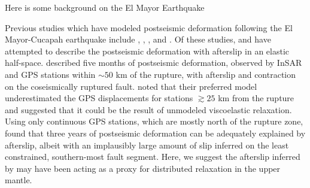 \documentclass[draft,linenumbers]{AGUJournal}
\begin{document}
Here is some background on the El Mayor Earthquake


Previous studies which have modeled postseismic deformation following the El Mayor-Cucapah earthquake include \citet{Pollitz2012}, \citet{Gonzalez-ortega2014}, \citet{Spinler2015}, and \citet{Rollins2015}. Of these studies, \citet{Gonzalez-ortega2014} and \citet{Rollins2015} have attempted to describe the postseismic deformation with afterslip in an elastic half-space.  \citet{Gonzalez-ortega2014} described five months of postseismic deformation, observed by InSAR and GPS stations within ${\sim}50$ km of the rupture, with afterslip and contraction on the coseismically ruptured fault. \citet{Gonzalez-ortega2014} noted that their preferred model underestimated the GPS displacements for stations $\gtrsim 25$ km from the rupture and suggested that it could be the result of unmodeled viscoelastic relaxation.  Using only continuous GPS stations, which are mostly north of the rupture zone, \citet{Rollins2015} found that three years of postseismic deformation can be adequately explained by afterslip, albeit with an implausibly large amount of slip inferred on the least constrained, southern-most fault segment. Here, we suggest the afterslip inferred by \citet{Rollins2015} may have been acting as a proxy for distributed relaxation in the upper mantle. 
\end{document}
